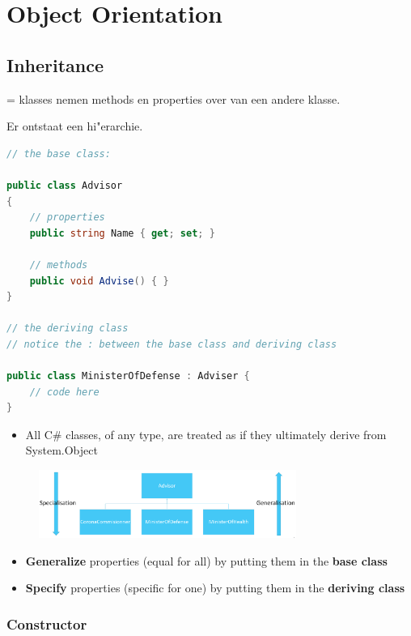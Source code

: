 \documentclass{article}
\newcommand{\bold}[1]{\textbf{#1}}
\begin{document}
\section{Object Orientation}

\subsection{Inheritance}

= klasses nemen methods en properties over van een andere klasse. 

Er ontstaat een hi"erarchie.

\begin{lstlisting}[language=csharp]
// the base class: 

public class Advisor
{
    // properties
    public string Name { get; set; }

    // methods
    public void Advise() { }
}

// the deriving class
// notice the : between the base class and deriving class

public class MinisterOfDefense : Adviser {
    // code here
}

\end{lstlisting}

\begin{itemize}
    \item All C\# classes, of any type, are treated as if they ultimately derive from System.Object
\end{itemize}

\begin{figure}[H]
    \centering
    \includegraphics[width=0.75\textwidth]{inheritance.png}
    \caption{}
\end{figure}

\begin{itemize}
    \item \bold{Generalize} properties (equal for all) by putting them in the \bold{base class}
    \item \bold{Specify} properties (specific for one) by putting them in the \bold{deriving class}
\end{itemize}

\subsubsection{Constructor}
\end{document}
